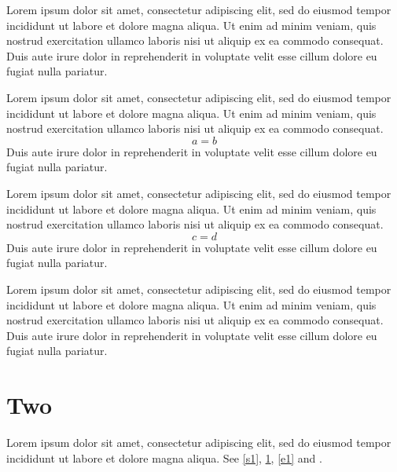 \documentclass{article}
\begin{document}
Lorem ipsum dolor sit amet, consectetur adipiscing elit, sed do eiusmod tempor incididunt ut labore et dolore magna aliqua. Ut enim ad minim veniam, quis nostrud exercitation ullamco laboris nisi ut aliquip ex ea commodo consequat. Duis aute irure dolor in reprehenderit in voluptate velit esse cillum dolore eu fugiat nulla pariatur.

\label{v1}Lorem ipsum dolor sit amet, consectetur adipiscing elit, sed do eiusmod tempor incididunt ut labore et dolore magna aliqua.\label{p1} Ut enim ad minim veniam, quis nostrud exercitation ullamco laboris nisi ut aliquip ex ea commodo consequat.
\begin{equation}\label{e1}
a = b
\end{equation}
Duis aute irure dolor in reprehenderit in voluptate velit esse cillum dolore eu fugiat nulla pariatur.\label{p2}

\label{v2}Lorem ipsum dolor sit amet, consectetur adipiscing elit, sed do eiusmod tempor incididunt ut labore et dolore magna aliqua.\label{p3} Ut enim ad minim veniam, quis nostrud exercitation ullamco laboris nisi ut aliquip ex ea commodo consequat.
\begin{equation}\label{e2}
c = d
\end{equation}
Duis aute irure dolor in reprehenderit in voluptate velit esse cillum dolore eu fugiat nulla pariatur.\label{p4}

\label{v3}Lorem ipsum dolor sit amet, consectetur adipiscing elit, sed do eiusmod tempor incididunt ut labore et dolore magna aliqua.\label{p5} Ut enim ad minim veniam, quis nostrud exercitation ullamco laboris nisi ut aliquip ex ea commodo consequat. Duis aute irure dolor in reprehenderit in voluptate velit esse cillum dolore eu fugiat nulla pariatur.\label{p6}

\section{Two}\label{s2}
\label{v4}Lorem ipsum dolor sit amet, consectetur adipiscing elit, sed do eiusmod tempor incididunt ut labore et dolore magna aliqua.\label{p7} See \cref{s1}, \cref{s2}, \cref{e1} and .
\end{document}
